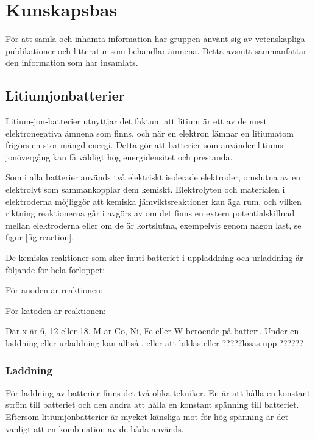\documentclass[a4paper,12pt]{article}
\begin{document}
\section{Kunskapsbas}
För att samla och inhämta information har gruppen använt sig av vetenskapliga publikationer och litteratur som behandlar ämnena. Detta avsnitt sammanfattar den information som har insamlats.

\subsection{Litiumjonbatterier}
Litium-jon-batterier utnyttjar det faktum att litium är ett av de mest elektronegativa ämnena som finns, och när en elektron lämnar en litiumatom frigörs en stor mängd energi. Detta gör att batterier som använder litiums jonövergång kan få väldigt hög energidensitet och prestanda.

Som i alla batterier används två elektriskt isolerade elektroder, omslutna av en elektrolyt som sammankopplar dem kemiskt. Elektrolyten och materialen i elektroderna möjliggör att kemiska jämviktsreaktioner kan äga rum, och vilken riktning reaktionerna går i avgörs av om det finns en extern potentialskillnad mellan elektroderna eller om de är kortslutna, exempelvis genom någon last, se figur \ref{fig:reaction}. \cite{glaize13}


De kemiska reaktioner som sker inuti batteriet i uppladdning och urladdning är följande för hela förloppet:

\centerline{}

För anoden är reaktionen:
\\
\centerline{}

För katoden är reaktionen:
\\
\centerline{}

Där x är 6, 12 eller 18. M är Co, Ni, Fe eller W beroende på batteri. Under en laddning eller urladdning kan alltså ,  eller  att bildas eller ?????lösas upp.?????? \cite{formler}

\subsubsection{Laddning}
För laddning av batterier finns det två olika tekniker. En är att hålla en konstant ström till batteriet och den andra att hålla en konstant spänning till batteriet. Eftersom litiumjonbatterier är mycket känsliga mot för hög spänning är det vanligt att en kombination av de båda används.
\end{document}

